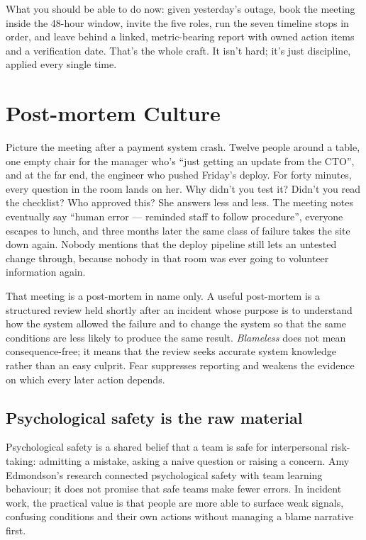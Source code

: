 What you should be able to do now: given yesterday's outage, book the meeting inside the 48-hour window, invite the five roles, run the seven timeline stops in order, and leave behind a linked, metric-bearing report with owned action items and a verification date. That's the whole craft. It isn't hard; it's just discipline, applied every single time.

\section{Post-mortem Culture}
Picture the meeting after a payment system crash. Twelve people around a table, one empty chair for the manager who's ``just getting an update from the CTO'', and at the far end, the engineer who pushed Friday's deploy. For forty minutes, every question in the room lands on her. Why didn't you test it? Didn't you read the checklist? Who approved this? She answers less and less. The meeting notes eventually say ``human error — reminded staff to follow procedure'', everyone escapes to lunch, and three months later the same class of failure takes the site down again. Nobody mentions that the deploy pipeline still lets an untested change through, because nobody in that room was ever going to volunteer information again.


That meeting is a post-mortem in name only. A useful post-mortem is a structured review held shortly after an incident whose purpose is to understand how the system allowed the failure and to change the system so that the same conditions are less likely to produce the same result. \emph{Blameless} does not mean consequence-free; it means that the review seeks accurate system knowledge rather than an easy culprit. Fear suppresses reporting and weakens the evidence on which every later action depends. \autocite{google-postmortem}



\subsection{Psychological safety is the raw material}


Psychological safety is a shared belief that a team is safe for interpersonal risk-taking: admitting a mistake, asking a naive question or raising a concern. Amy Edmondson's research connected psychological safety with team learning behaviour; it does not promise that safe teams make fewer errors. In incident work, the practical value is that people are more able to surface weak signals, confusing conditions and their own actions without managing a blame narrative first. \autocite{edmondson-1999}


